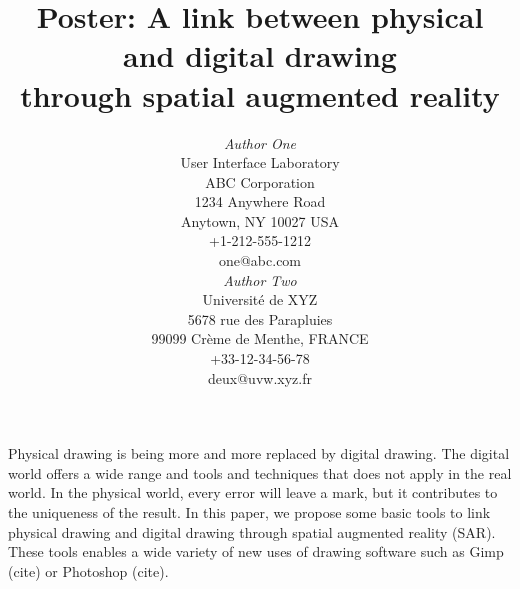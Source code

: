 \documentclass{article}
\begin{document}




\title{Poster: A link between physical and digital drawing \\
       through spatial augmented reality}


\author{
\parbox[t]{9cm}{\centering
	     {\em Author One}\\
	     User Interface Laboratory\\
             ABC Corporation\\
	     1234 Anywhere Road\\
	     Anytown, NY 10027 USA\\
	     +1-212-555-1212\\
	     one@abc.com}
\parbox[t]{9cm}{\centering
	     {\em Author Two}\\
	     Universit\'{e} de XYZ\\
	     5678 rue des Parapluies\\
	     99099 Cr\`{e}me de Menthe, FRANCE\\
	     +33-12-34-56-78\\
	     deux@uvw.xyz.fr}
}

\maketitle

\abstract

Physical drawing is being more and more replaced by digital drawing. The digital world offers a wide range and tools and techniques that does not apply in the real world. In the physical world, every error will leave a mark, but it contributes to the uniqueness of the result. In this paper, we propose some basic tools to link physical drawing and digital drawing through spatial augmented reality (SAR). These tools enables a wide variety of new uses of drawing software such as Gimp (cite) or Photoshop (cite). 
\end{document}
